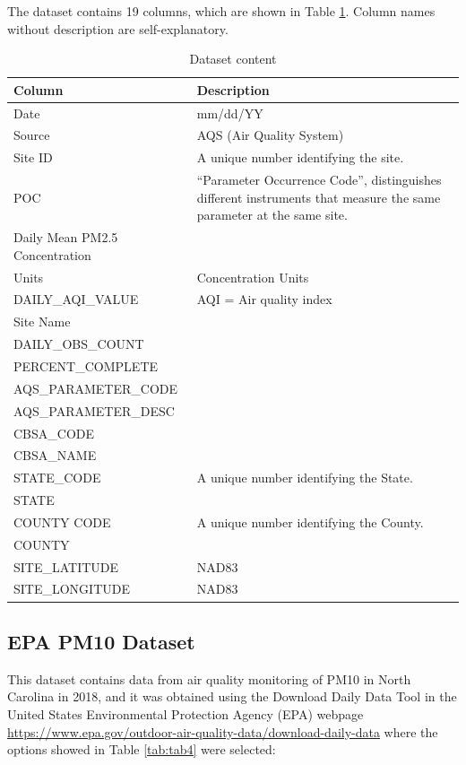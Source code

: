 \documentclass[12pt,]{article}
\begin{document}
The dataset contains 19 columns, which are shown in Table
\ref{tab:tab3}. Column names without description are self-explanatory.

\newpage

\begin{table}[ht]
\centering
\begin{tabular}{p{2.5in}p{3.5in}}
  \hline
Column & Description \\ 
  \hline
Date & mm/dd/YY \\ 
  Source & AQS (Air Quality System) \\ 
  Site ID & A unique number identifying the site. \\ 
  POC & “Parameter Occurrence Code”, distinguishes different instruments that measure the same parameter at the same site. \\ 
  Daily Mean PM2.5 Concentration &  \\ 
  Units & Concentration Units \\ 
  DAILY\_AQI\_VALUE & AQI = Air quality index \\ 
  Site Name &  \\ 
  DAILY\_OBS\_COUNT &  \\ 
  PERCENT\_COMPLETE &  \\ 
  AQS\_PARAMETER\_CODE &  \\ 
  AQS\_PARAMETER\_DESC &  \\ 
  CBSA\_CODE &  \\ 
  CBSA\_NAME &  \\ 
  STATE\_CODE & A unique number identifying the State. \\ 
  STATE &  \\ 
  COUNTY CODE & A unique number identifying the County. \\ 
  COUNTY &  \\ 
  SITE\_LATITUDE & NAD83 \\ 
  SITE\_LONGITUDE & NAD83 \\ 
   \hline
\end{tabular}
\caption{Dataset content} 
\label{tab:tab3}
\end{table}

\subsection{EPA PM10 Dataset}\label{epa-pm10-dataset}

This dataset contains data from air quality monitoring of PM10 in North
Carolina in 2018, and it was obtained using the Download Daily Data Tool
in the United States Environmental Protection Agency (EPA) webpage
\url{https://www.epa.gov/outdoor-air-quality-data/download-daily-data}
where the options showed in Table \ref{tab:tab4} were selected:
\end{document}
